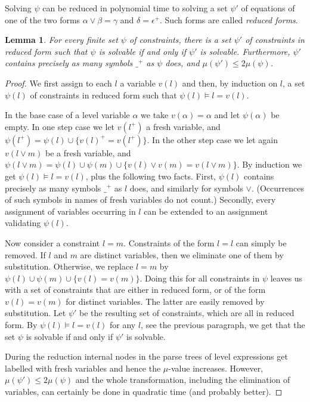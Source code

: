 \documentclass[11pt,a4paper]{article}
\newtheorem{lemma}{Lemma}[theorem]
\newcommand{\set}[1]{\{#1\}}
\begin{document}
Solving  $\psi$ can be reduced in polynomial time to solving a set  $\psi'$ of
equations of one of the two forms $\alpha\vee\beta = \gamma$
and $\delta = \epsilon^+$. Such forms are called \emph{reduced forms}.

\begin{lemma}\label{lem:reduced-form}
For every finite set  $\psi$ of constraints, there is a set  $\psi'$ of
constraints in reduced form such that  $\psi$ is solvable if and only if  $\psi'$
is solvable. Furthermore,  $\psi'$ contains precisely as many symbols $\_^+$ as  $\psi$ does,
and $\mu(\psi')\leq 2\mu(\psi)$.
\end{lemma}

\begin{proof}
We first assign to each $l$ a variable $v(l)$ and then, by induction on $l$,
a set $ \psi(l)$ of constraints in reduced form such that $ \psi(l)\models l = v(l)$.

In the base case of a level variable $\alpha$ we take $v(\alpha)=\alpha$ and let $ \psi(\alpha)$ be empty. In one step case we let $v(l^+)$ a fresh variable,
and $ \psi(l^+) =  \psi(l) \cup \set{v(l)^+ =v(l^+)}$.
In the other step case we let again $v(l\vee m)$ be a fresh variable,
and $ \psi(l\vee m) =  \psi(l) \cup  \psi(m) \cup \set{v(l)\vee v(m) =v(l\vee m)}$.
By induction we get $\psi(l)\models l = v(l)$, plus the following two facts.
First, $ \psi(l)$ contains precisely as many symbols $\_^+$ as $l$ does,
and similarly for symbols $\vee$.
(Occurrences of such symbols in names of fresh variables do not count.)
Secondly, every assignment of variables occurring in $l$ can be extended to an
assignment validating $\psi(l)$.

Now consider a constraint $l=m$. Constraints of the form $l=l$ can
simply be removed. If $l$ and $m$ are distinct variables,
then we eliminate one of them by substitution. Otherwise,
we replace $l=m$ by $ \psi(l)\cup  \psi(m)\cup \set{v(l)=v(m)}$.
Doing this for all constraints in  $\psi$
leaves us with a set of constraints that are either in
reduced form, or of the form $v(l)=v(m)$ for distinct variables.
The latter are easily removed by substitution. Let  $\psi'$ be the resulting set
of constraints, which are all in reduced form. By $\psi(l)\models l = v(l)$
for any $l$, see the previous paragraph, we get that the set $\psi$ is solvable if
and only if  $\psi'$ is solvable.

During the reduction internal nodes in the parse trees of level expressions get labelled with fresh variables and hence the $\mu$-value increases. However,  $\mu(\psi')\leq 2\mu(\psi)$ and the whole transformation, including the
elimination of variables, can certainly be done in quadratic time
(and probably better).
\end{proof}
\end{document}
